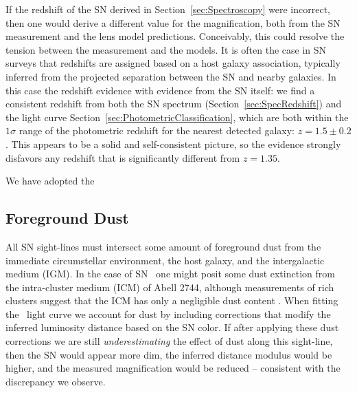 If the redshift of the SN derived in Section~\ref{sec:Spectroscopy}
were incorrect, then one would derive a different value for the
magnification, both from the SN measurement and the lens model
predictions.  Conceivably, this could resolve the tension between the
measurement and the models.  It is often the case in SN surveys that
redshifts are assigned based on a host galaxy association, typically
inferred from the projected separation between the SN and nearby
galaxies.  In this case the redshift evidence  with evidence from the SN
itself: we find a consistent redshift from both the SN spectrum
(Section~\ref{sec:SpecRedshift}) and the light curve
Section~\ref{sec:PhotometricClassification}, which are both within the
$1\sigma$ range of the photometric redshift for the nearest detected
galaxy: $z=1.5\pm0.2$. This appears to be a solid and self-consistent
picture, so the evidence strongly disfavors any redshift that is
significantly different from $z=1.35$.

We have adopted the 


\subsection{Foreground Dust}
\label{sec:ForegroundDust}

All SN sight-lines must intersect some amount of foreground dust from
the immediate circumstellar environment, the host galaxy, and the
intergalactic medium (IGM). In the case of SN \tomas\ one might posit
some dust extinction from the intra-cluster medium (ICM) of Abell
2744, although measurements of rich clusters suggest that the ICM has
only a negligible dust
content \citep{Maoz:1995,Stickel:2002,Bai:2007}.  When fitting
the \tomas\ light curve we account for dust by including corrections
that modify the inferred luminosity distance based on the SN color.
If after applying these dust corrections we are still {\it
underestimating} the effect of dust along this sight-line, then the SN
would appear more dim, the inferred distance modulus would be higher,
and the measured magnification would be reduced -- consistent with the
discrepancy we observe.

